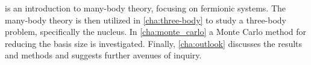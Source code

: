 \documentclass[../main/report.tex]{subfiles}
\begin{document}
 is an introduction to many-body theory, focusing on fermionic systems. 
The many-body theory is then utilized in \cref{cha:three-body} 
to study a three-body problem, specifically the  nucleus.  
In \cref{cha:monte_carlo} a Monte Carlo method for reducing the basis size is investigated. 
Finally, \cref{cha:outlook} discusses the results and methods and suggests further avenues of inquiry.
\end{document}
